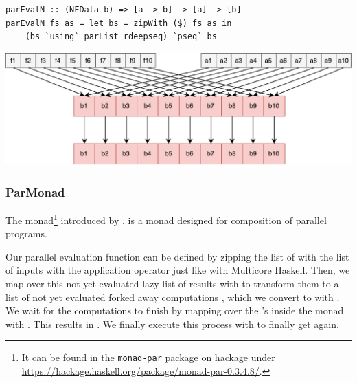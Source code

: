 \begin{lstlisting}[frame=htrbl]
parEvalN :: (NFData b) => [a -> b] -> [a] -> [b]
parEvalN fs as = let bs = zipWith ($) fs as in
	(bs `using` parList rdeepseq) `pseq` bs
\end{lstlisting}
\begin{center}
	\includegraphics[scale=0.5]{images/parEvalNMulticore}
\end{center} %

\subsubsection{ParMonad}
The  monad\footnote{It can be found in the \texttt{monad-par} package on hackage under \url{https://hackage.haskell.org/package/monad-par-0.3.4.8/}.} introduced by \citet{monad_par_paper_2011}, is a monad designed for composition of parallel programs.


Our parallel evaluation function  can be defined by zipping the list of \code{[a -> b]} with the list of inputs \code{[a]} with the application operator \code{\$} just like with Multicore Haskell. Then, we map over this not yet evaluated lazy list of results \code{[b]} with  to transform them to a list of not yet evaluated forked away computations , which we convert to  with . We wait for the computations to finish by mapping over the 's inside the  monad with . This results in . We finally execute this process with  to finally get \code{[b]} again.

